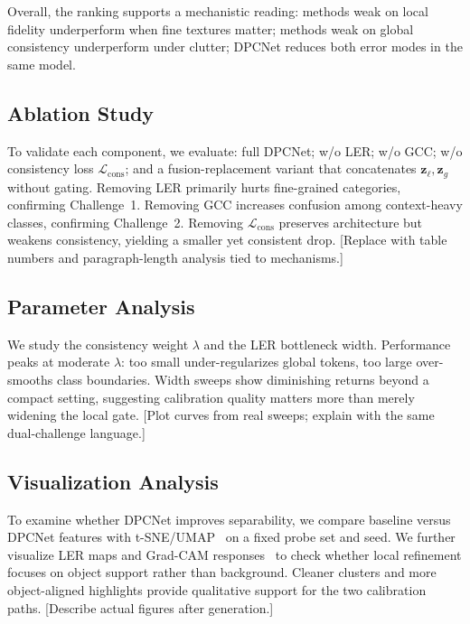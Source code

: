 \documentclass[11pt,a4paper]{article}
\begin{document}
Overall, the ranking supports a mechanistic reading: methods weak on local fidelity underperform when fine textures matter; methods weak on global consistency underperform under clutter; DPCNet reduces both error modes in the same model.

\subsection{Ablation Study}
\label{sec:ablation}
To validate each component, we evaluate: full DPCNet; w/o LER; w/o GCC; w/o consistency loss $\mathcal{L}_{\mathrm{cons}}$; and a fusion-replacement variant that concatenates $\mathbf{z}_{\ell},\mathbf{z}_{g}$ without gating.
Removing LER primarily hurts fine-grained categories, confirming Challenge~1.
Removing GCC increases confusion among context-heavy classes, confirming Challenge~2.
Removing $\mathcal{L}_{\mathrm{cons}}$ preserves architecture but weakens consistency, yielding a smaller yet consistent drop.
[Replace with table numbers and paragraph-length analysis tied to mechanisms.]

\subsection{Parameter Analysis}
\label{sec:param}
We study the consistency weight $\lambda$ and the LER bottleneck width.
Performance peaks at moderate $\lambda$: too small under-regularizes global tokens, too large over-smooths class boundaries.
Width sweeps show diminishing returns beyond a compact setting, suggesting calibration quality matters more than merely widening the local gate.
[Plot curves from real sweeps; explain with the same dual-challenge language.]

\subsection{Visualization Analysis}
\label{sec:vis}
To examine whether DPCNet improves separability, we compare baseline versus DPCNet features with t-SNE/UMAP~\cite{vandermaaten2008tsne,mcinnes2018umap} on a fixed probe set and seed.
We further visualize LER maps and Grad-CAM responses~\cite{selvaraju2017gradcam} to check whether local refinement focuses on object support rather than background.
Cleaner clusters and more object-aligned highlights provide qualitative support for the two calibration paths.
[Describe actual figures after generation.]
\end{document}
